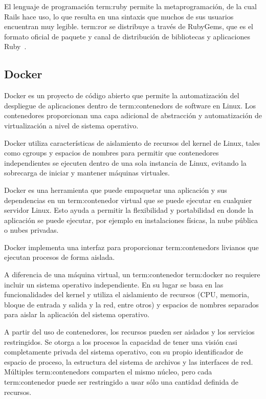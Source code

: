 El lenguaje de programación \gls{term:ruby} permite la metaprogramación, de la cual Rails
hace uso, lo que resulta en una sintaxis que muchos de sus usuarios encuentran
muy legible. \gls{term:ror} se distribuye a través de RubyGems, que es el formato
oficial de paquete y canal de distribución de bibliotecas y aplicaciones
Ruby~\cite{ror}.

\subsection{Docker}

Docker es un proyecto de código abierto que permite la automatización del
despliegue de aplicaciones dentro de \glspl{term:contenedor} de software en Linux. Los
contenedores proporcionan una capa adicional de abstracción y automatización de
virtualización a nivel de sistema operativo.

Docker utiliza características de aislamiento de recursos del kernel de Linux,
tales como cgroups y espacios de nombres para permitir que contenedores
independientes se ejecuten dentro de una sola instancia de Linux, evitando la
sobrecarga de iniciar y mantener máquinas virtuales.

Docker es una herramienta que puede empaquetar una aplicación y sus
dependencias en un \gls{term:contenedor} virtual que se puede ejecutar en cualquier
servidor Linux. Esto ayuda a permitir la flexibilidad y portabilidad en donde
la aplicación se puede ejecutar, por ejemplo en instalaciones físicas, la nube
pública o nubes privadas.

Docker implementa una interfaz para proporcionar \glspl{term:contenedor} livianos que
ejecutan procesos de forma aislada.

A diferencia de una máquina virtual, un \gls{term:contenedor} \gls{term:docker} no requiere incluir
un sistema operativo independiente. En su lugar se basa en las funcionalidades
del kernel y utiliza el aislamiento de recursos (CPU, memoria, bloque de
entrada y salida y la red, entre otros) y espacios de nombres separados para
aislar la aplicación del sistema operativo.

A partir del uso de contenedores, los recursos pueden ser aislados y los
servicios restringidos. Se otorga a los procesos la capacidad de tener una
visión casi completamente privada del sistema operativo, con su propio
identificador de espacio de proceso, la estructura del sistema de archivos y
las interfaces de red. Múltiples \glspl{term:contenedor} comparten el mismo núcleo, pero
cada \gls{term:contenedor} puede ser restringido a usar sólo una cantidad definida de
recursos.

